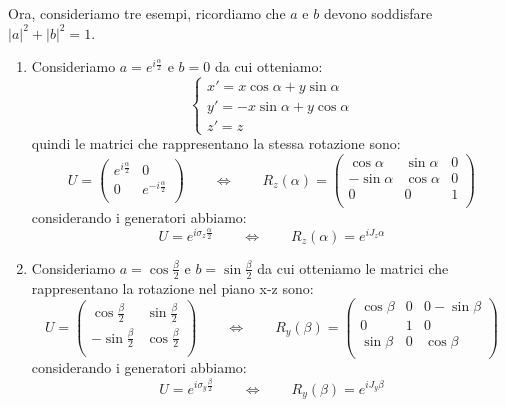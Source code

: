 Ora, consideriamo tre esempi, ricordiamo che $a$ e $b$ devono soddisfare $|a|^2+|b|^2=1$.
\begin{enumerate}
    \item  Consideriamo $a=e^{i\frac{\alpha}{2}}$ e $b=0$ da cui otteniamo:
    \begin{equation}
        \begin{cases}
             x'=x\cos{\alpha}+y\sin{\alpha}\\
        y'=-x\sin{\alpha}+y\cos{\alpha}\\
        z'=z
        \end{cases}
    \end{equation}
quindi le matrici che rappresentano la stessa rotazione sono:
\begin{equation}
        U=\begin{pmatrix}
e^{i\frac{\alpha}{2}}  &0\\
0&e^{-i\frac{\alpha}{2}}\\
\end{pmatrix} \qquad\Longleftrightarrow\qquad R_z(\alpha)= \begin{pmatrix}
 \cos{\alpha}&\sin{\alpha}&0  \\
  -\sin{\alpha}&\cos{\alpha}&0\\
0&0&1\\
\end{pmatrix}
    \end{equation}
    considerando i generatori abbiamo:
    \begin{equation}
        U=e^{i\sigma_z\frac{\alpha}{2}} \qquad\Longleftrightarrow\qquad R_z(\alpha)= e^{iJ_z\alpha}
    \end{equation}



    
    \item Consideriamo $a=\cos{\frac{\beta}{2}}$ e $b=\sin{\frac{\beta}{2}}$ da cui otteniamo le matrici che rappresentano la rotazione nel piano x-z sono:
\begin{equation}
        U=\begin{pmatrix}
\cos{\frac{\beta}{2}}  &\sin{\frac{\beta}{2}}\\
-\sin{\frac{\beta}{2}}&\cos{\frac{\beta}{2}}\\
\end{pmatrix} \qquad\Longleftrightarrow\qquad  R_y(\beta)= \begin{pmatrix}
 \cos{\beta}&0&0-\sin{\beta} \\
 0&1&0\\
  \sin{\beta}&0&\cos{\beta}\\
\end{pmatrix}
    \end{equation}
    considerando i generatori abbiamo:
    \begin{equation}
        U=e^{i\sigma_y\frac{\beta}{2}} \qquad\Longleftrightarrow\qquad R_y(\beta)= e^{iJ_y\beta}
    \end{equation}




\end{enumerate}
